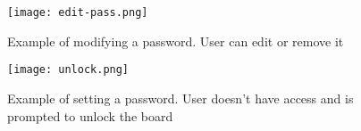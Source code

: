 \begin{figure}[H]
    \centering
    \texttt{[image: edit-pass.png]}
    \caption{Example of modifying a password. User can edit or remove it}
    \label{fig:edit-pass}
\end{figure}

\begin{figure}[H]
    \centering
    \texttt{[image: unlock.png]}
    \caption{Example of setting a password. User doesn't have access and is prompted to unlock the board}
    \label{fig:unlock-pass}
\end{figure}

